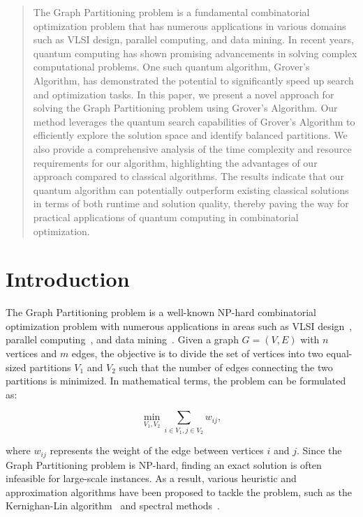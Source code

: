 \begin{abstract}
The Graph Partitioning problem is a fundamental combinatorial optimization problem that has numerous applications in various domains such as VLSI design, parallel computing, and data mining. In recent years, quantum computing has shown promising advancements in solving complex computational problems. One such quantum algorithm, Grover's Algorithm, has demonstrated the potential to significantly speed up search and optimization tasks. In this paper, we present a novel approach for solving the Graph Partitioning problem using Grover's Algorithm. Our method leverages the quantum search capabilities of Grover's Algorithm to efficiently explore the solution space and identify balanced partitions. We also provide a comprehensive analysis of the time complexity and resource requirements for our algorithm, highlighting the advantages of our approach compared to classical algorithms. The results indicate that our quantum algorithm can potentially outperform existing classical solutions in terms of both runtime and solution quality, thereby paving the way for practical applications of quantum computing in combinatorial optimization.

\end{abstract}

\section{Introduction}

The Graph Partitioning problem is a well-known NP-hard combinatorial optimization problem with numerous applications in areas such as VLSI design~\cite{vlsi}, parallel computing~\cite{parallel}, and data mining~\cite{data_mining}. Given a graph $G=(V,E)$ with $n$ vertices and $m$ edges, the objective is to divide the set of vertices into two equal-sized partitions $V_1$ and $V_2$ such that the number of edges connecting the two partitions is minimized. In mathematical terms, the problem can be formulated as:

\begin{equation}
\min_{V_1, V_2} \sum_{i \in V_1, j \in V_2} w_{ij},
\end{equation}

where $w_{ij}$ represents the weight of the edge between vertices $i$ and $j$. Since the Graph Partitioning problem is NP-hard, finding an exact solution is often infeasible for large-scale instances. As a result, various heuristic and approximation algorithms have been proposed to tackle the problem, such as the Kernighan-Lin algorithm~\cite{kernighan_lin} and spectral methods~\cite{spectral}.

